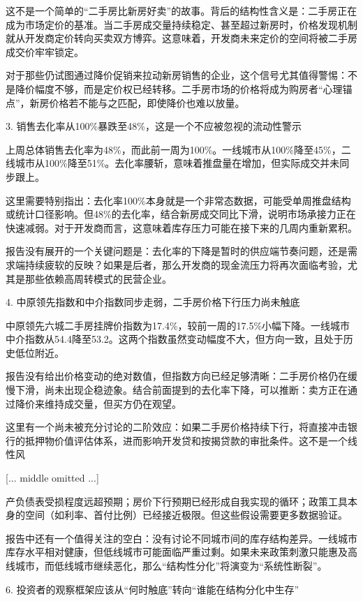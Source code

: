 \documentclass[11pt]{ctexart}
\begin{document}
这不是一个简单的“二手房比新房好卖”的故事。背后的结构性含义是：二手房正在成为市场定价的基准。当二手房成交量持续稳定、甚至超过新房时，价格发现机制就从开发商定价转向买卖双方博弈。这意味着，开发商未来定价的空间将被二手房成交价牢牢锁定。

对于那些仍试图通过降价促销来拉动新房销售的企业，这个信号尤其值得警惕：不是降价幅度不够，而是定价权已经转移。二手房市场的价格将成为购房者“心理锚点”，新房价格若不能与之匹配，即使降价也难以放量。

3. 销售去化率从100\%暴跌至48\%，这是一个不应被忽视的流动性警示

上周总体销售去化率为48\%，而此前一周为100\%。一线城市从100\%降至45\%，二线城市从100\%降至51\%。去化率腰斩，意味着推盘量在增加，但实际成交并未同步跟上。

这里需要特别指出：去化率100\%本身就是一个非常态数据，可能受单周推盘结构或统计口径影响。但48\%的去化率，结合新房成交同比下滑，说明市场承接力正在快速减弱。对于开发商而言，这意味着库存压力可能在接下来的几周内重新累积。

报告没有展开的一个关键问题是：去化率的下降是暂时的供应端节奏问题，还是需求端持续疲软的反映？如果是后者，那么开发商的现金流压力将再次面临考验，尤其是那些依赖高周转模式的民营企业。

4. 中原领先指数和中介指数同步走弱，二手房价格下行压力尚未触底

中原领先六城二手房挂牌价指数为17.4\%，较前一周的17.5\%小幅下降。一线城市中介指数从54.4降至53.2。这两个指数虽然变动幅度不大，但方向一致，且处于历史低位附近。

报告没有给出价格变动的绝对数值，但指数方向已经足够清晰：二手房价格仍在缓慢下滑，尚未出现企稳迹象。结合前面提到的去化率下降，可以推断：卖方正在通过降价来维持成交量，但买方仍在观望。

这里有一个尚未被充分讨论的二阶效应：如果二手房价格持续下行，将直接冲击银行的抵押物价值评估体系，进而影响开发贷和按揭贷款的审批条件。这不是一个线性风

[... middle omitted ...]

产负债表受损程度远超预期；房价下行预期已经形成自我实现的循环；政策工具本身的空间（如利率、首付比例）已经接近极限。但这些假设需要更多数据验证。

报告中还有一个值得关注的空白：没有讨论不同城市间的库存结构差异。一线城市库存水平相对健康，但低线城市可能面临严重过剩。如果未来政策刺激只能惠及高线城市，而低线城市继续恶化，那么“结构性分化”将演变为“系统性断裂”。

6. 投资者的观察框架应该从“何时触底”转向“谁能在结构分化中生存”
\end{document}
